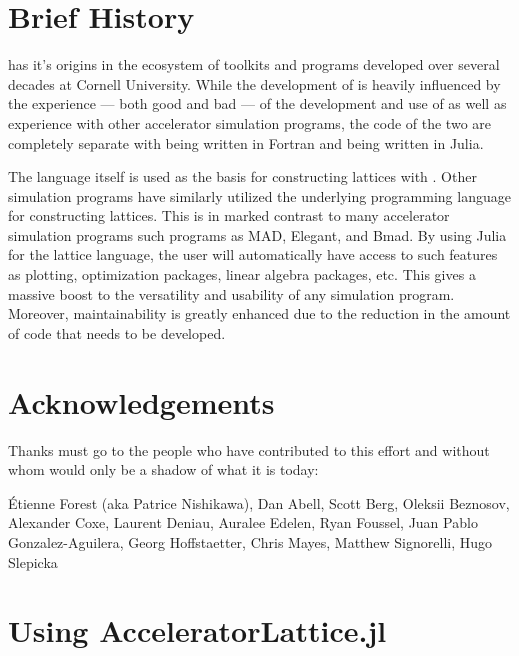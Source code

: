 \section{Brief History}

\accellat has it's origins in the \bmad\cite{Sagan:Bmad2006} ecosystem of toolkits and programs 
developed over several decades at Cornell University.
While the development of \accellat is heavily influenced by the 
experience --- both good and bad --- of the development and use of \bmad as well as experience
with other accelerator simulation programs, the code of the two are
completely separate with \bmad being written in Fortran and \accellat being written in Julia.

The \julia language itself is used as the basis for constructing lattices with \accellat. 
Other simulation programs
have similarly utilized the underlying programming language for constructing 
lattices\cite{Appleby:Merlin2020,Iadarola:Xsuite2023}. This is in marked contrast to many accelerator
simulation programs such programs as MAD\cite{Grote:MAD1989}, Elegant\cite{Borland:Elegant2000}, and
Bmad. 
By using Julia for the lattice language, the user will automatically have access to such features 
as plotting, optimization packages, linear algebra packages, etc. 
This gives a massive boost to the versatility and usability of any \scibmad simulation program.
Moreover, maintainability is greatly enhanced due to the reduction in the amount of code that needs
to be developed.

\section{Acknowledgements}

Thanks must go to the people who have contributed to this effort and without
whom \scibmad would only be a shadow of what it is today: 

\'Etienne Forest (aka Patrice Nishikawa),
Dan Abell,
Scott Berg,
Oleksii Beznosov,
Alexander Coxe,
Laurent Deniau,
Auralee Edelen,
Ryan Foussel,
Juan Pablo Gonzalez-Aguilera,
Georg Hoffstaetter,
Chris Mayes,
Matthew Signorelli,
Hugo Slepicka

\section{Using AcceleratorLattice.jl}

